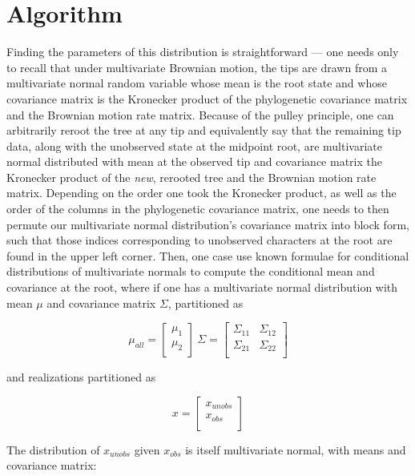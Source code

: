 \documentclass[10pt]{article}
\begin{document}
\section{Algorithm}

Finding the parameters of this distribution is straightforward --- one needs only to recall that under multivariate Brownian motion, the tips are drawn from a multivariate normal random variable whose mean is the root state and whose covariance matrix is the Kronecker product of the phylogenetic covariance matrix and the Brownian motion rate matrix. Because of the pulley principle, one can arbitrarily reroot the tree at any tip and equivalently say that the remaining tip data, along with the unobserved state at the midpoint root, are multivariate normal distributed with mean at the observed tip and covariance matrix the Kronecker product of the \textit{new}, rerooted tree and the Brownian motion rate matrix. Depending on the order one took the Kronecker product, as well as the order of the columns in the phylogenetic covariance matrix, one needs to then permute our multivariate normal distribution's covariance matrix into block form, such that those indices corresponding to unobserved characters at the root are found in the upper left corner. Then, one case use known formulae for conditional distributions of multivariate normals to compute the conditional mean and covariance at the root, where if one has a multivariate normal distribution with mean $\mu$ and covariance matrix $\Sigma$, partitioned as

{\large\[\mu_{all} = \begin{bmatrix}
\mu_{1} \\
\mu_{2} \\
\end{bmatrix} \
\Sigma = \begin{bmatrix}
\Sigma_{11} & \Sigma_{12}\\
\Sigma_{21} & \Sigma_{22}\\
\end{bmatrix}
\]}

and realizations partitioned as

{\large\[x = \begin{bmatrix}
x_{unobs} \\
x_{obs} \\
\end{bmatrix}\]}

The distribution of $x_{unobs}$ given $x_{obs}$ is itself multivariate normal, with means and covariance matrix:
\end{document}
